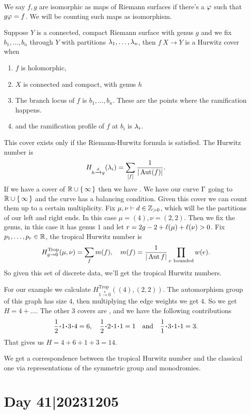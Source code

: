 \documentclass[12pt]{memoir}
\DeclareMathOperator{\Trop}{Trop}
\begin{document}
We say $f,g$ are isomorphic as maps of Riemann surfaces if there's a $\varphi$ such that $g\varphi=f$. We will be counting such maps as isomorphism.\par 
Suppose $Y$ is a connected, compact Riemann surface with genus $g$  and we fix $b_1,\dots,b_n$ through $Y$ with partitions $\lambda_1,\dots,\lambda_n$, then $f\: X\to Y$ is a Hurwitz cover when 
\begin{enumerate}
    \item $f$ is holomorphic,
    \item $X$ is connected and compact, with genus $h$
    \item The branch locus of $f$ is $b_1,\dots,b_n$. These are the points where the ramification happens.
    \item and the ramification profile of $f$ at $b_i$ is $\lambda_i$.
\end{enumerate}
This cover exists only if the Riemann-Hurwitz formula is satisfied. The Hurwitz number is 
$$H_{h\xrightarrow{d}g}(\lambda_i)=\sum_{[f]}\frac{1}{|\operatorname{Aut}(f)|}.$$
If we have a cover of $\mathbb{R}\cup\{\,\infty\,\}$ then we have . We have our curve $\Gamma$ going to $\mathbb{R}\cup\{\,\infty\,\}$ and the curve has a balancing condition. Given this cover we can count them up to a certain multiplicity. Fix $\mu,\nu\vdash d\in\mathbb{Z}_{>0}$, which will be the partitions of our left and right ends. In this case $\mu=(4),\nu=(2,2)$. Then we fix the genus, in this case it has genus $1$ and let $r=2g-2+\ell(\mu)+\ell(\nu)>0$. Fix $p_1,\dots,p_r\in\mathbb{R}$, the tropical Hurwitz number is 
$$H_{g\to 0}^{\Trop}(\mu,\nu)=\sum_fm(f),\quad m(f)=\frac{1}{|\Aut f|}\prod_{e\ \text{bounded}}w(e).$$
So given this set of discrete data, we'll get the tropical Hurwitz numbers.

\begin{Ex}
    For our example we calculate $H^{\Trop}_{1\xrightarrow{4}0}((4),(2,2))$. The automorphism group of this graph has size $4$, then multiplying the edge weights we get $4$. So we get $H=4+\dots$. The other $3$ covers are , and we have the following contributions
    $$\frac{1}{2}\.1\.3\.4=6,\quad\frac{1}{2}\.2\.1\.1=1\word{and} \frac{1}{1}\.3\.1\.1=3.$$
    That gives us $H=4+6+1+3=14$.
\end{Ex}

We get a correspondence between the tropical Hurwitz number and the classical one via representations of the symmetric group and monodromies.

\section{Day 41|20231205}
\end{document}
